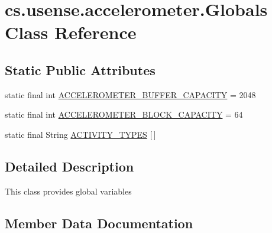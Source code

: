 \hypertarget{classcs_1_1usense_1_1accelerometer_1_1_globals}{}\section{cs.\+usense.\+accelerometer.\+Globals Class Reference}
\label{classcs_1_1usense_1_1accelerometer_1_1_globals}
\subsection*{Static Public Attributes}
\begin{DoxyCompactItemize}
\item 
static final int \hyperlink{classcs_1_1usense_1_1accelerometer_1_1_globals_a3e4e0b0c009feb8c6049f06bfd0a8672}{A\+C\+C\+E\+L\+E\+R\+O\+M\+E\+T\+E\+R\+\_\+\+B\+U\+F\+F\+E\+R\+\_\+\+C\+A\+P\+A\+C\+I\+T\+Y} = 2048
\item 
static final int \hyperlink{classcs_1_1usense_1_1accelerometer_1_1_globals_a5a685e102e42404d2f1d12d47edc46af}{A\+C\+C\+E\+L\+E\+R\+O\+M\+E\+T\+E\+R\+\_\+\+B\+L\+O\+C\+K\+\_\+\+C\+A\+P\+A\+C\+I\+T\+Y} = 64
\item 
static final String \hyperlink{classcs_1_1usense_1_1accelerometer_1_1_globals_a95684c30d5b4ba3d97e87d6967560fa0}{A\+C\+T\+I\+V\+I\+T\+Y\+\_\+\+T\+Y\+P\+E\+S} \mbox{[}$\,$\mbox{]}
\end{DoxyCompactItemize}


\subsection{Detailed Description}
This class provides global variables 

\subsection{Member Data Documentation}
\hypertarget{classcs_1_1usense_1_1accelerometer_1_1_globals_a5a685e102e42404d2f1d12d47edc46af}{}

